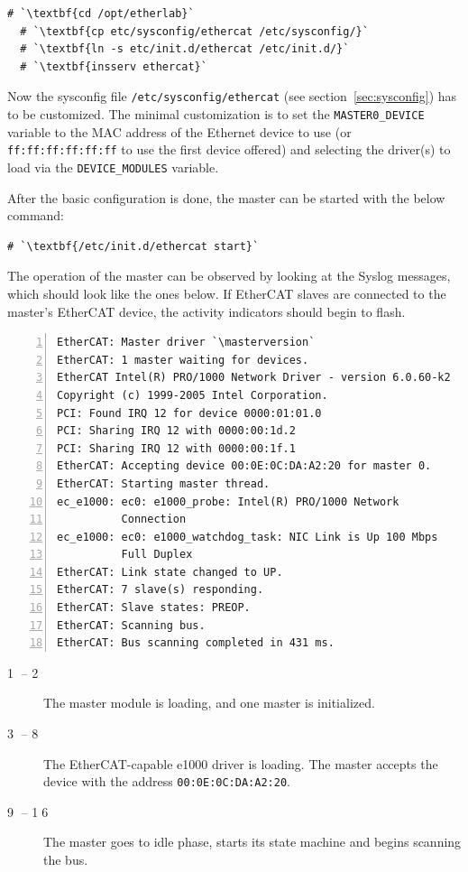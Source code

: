 \documentclass[a4paper,12pt,BCOR6mm,bibtotoc,idxtotoc]{scrbook}
\newcommand{\masterversion}{1.4.0}
\newcommand{\linenum}[1]{\normalfont\textcircled{\tiny #1}}
\begin{document}
\begin{lstlisting}[gobble=2]
  # `\textbf{cd /opt/etherlab}`
  # `\textbf{cp etc/sysconfig/ethercat /etc/sysconfig/}`
  # `\textbf{ln -s etc/init.d/ethercat /etc/init.d/}`
  # `\textbf{insserv ethercat}`
\end{lstlisting}

Now the sysconfig file \texttt{/etc/sysconfig/ethercat} (see
section~\ref{sec:sysconfig}) has to be customized. The minimal customization
is to set the \lstinline+MASTER0_DEVICE+ variable to the MAC address of the
Ethernet device to use (or \lstinline+ff:ff:ff:ff:ff:ff+ to use the first
device offered) and selecting the driver(s) to load via the
\lstinline+DEVICE_MODULES+ variable.

After the basic configuration is done, the master can be started with
the below command:

\begin{lstlisting}[gobble=2]
  # `\textbf{/etc/init.d/ethercat start}`
\end{lstlisting}

The operation of the master can be observed by looking at the
Syslog messages, which should look like the ones below.  If
EtherCAT slaves are connected to the master's EtherCAT device, the activity
indicators should begin to flash.

\begin{lstlisting}[numbers=left]
EtherCAT: Master driver `\masterversion`
EtherCAT: 1 master waiting for devices.
EtherCAT Intel(R) PRO/1000 Network Driver - version 6.0.60-k2
Copyright (c) 1999-2005 Intel Corporation.
PCI: Found IRQ 12 for device 0000:01:01.0
PCI: Sharing IRQ 12 with 0000:00:1d.2
PCI: Sharing IRQ 12 with 0000:00:1f.1
EtherCAT: Accepting device 00:0E:0C:DA:A2:20 for master 0.
EtherCAT: Starting master thread.
ec_e1000: ec0: e1000_probe: Intel(R) PRO/1000 Network
          Connection
ec_e1000: ec0: e1000_watchdog_task: NIC Link is Up 100 Mbps
          Full Duplex
EtherCAT: Link state changed to UP.
EtherCAT: 7 slave(s) responding.
EtherCAT: Slave states: PREOP.
EtherCAT: Scanning bus.
EtherCAT: Bus scanning completed in 431 ms.
\end{lstlisting}

\begin{description}

\item[\linenum{1} -- \linenum{2}] The master module is loading, and one master
is initialized.

\item[\linenum{3} -- \linenum{8}] The EtherCAT-capable e1000 driver is
loading. The master accepts the device with the address
\lstinline+00:0E:0C:DA:A2:20+.

\item[\linenum{9} -- \linenum{16}] The master goes to idle phase, starts its
state machine and begins scanning the bus.

\end{description}
\end{document}
